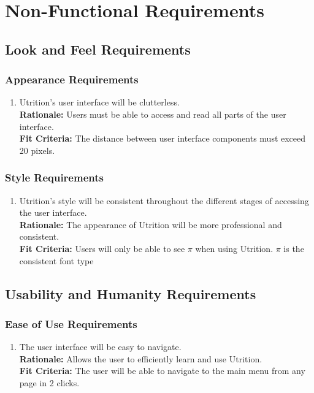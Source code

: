 \documentclass[12pt]{article}
\begin{document}
\section{Non-Functional Requirements}

\subsection{Look and Feel Requirements}

\subsubsection{Appearance Requirements}

\begin{enumerate}[{LF}1. ]
	\item Utrition’s user interface will be clutterless.\\
	\textbf{Rationale:} Users must be able to access and read all parts of the user interface. \\
	\textbf{Fit Criteria:} The distance between user interface components must exceed 20 pixels.
\end{enumerate}

\subsubsection{Style Requirements}

\begin{enumerate}[{LF}2. ]
	\item Utrition’s style will be consistent throughout the different stages of accessing the user interface.\\
	\textbf{Rationale:} The appearance of Utrition will be more professional and consistent. \\
	\textbf{Fit Criteria:} Users will only be able to see $\pi$ when using Utrition. $\pi$ is the consistent font type
\end{enumerate}

\subsection{Usability and Humanity Requirements}

\subsubsection{Ease of Use Requirements}

\begin{enumerate}[{UH}1. ]
	\item The user interface will be easy to navigate. \\
	\textbf{Rationale:} Allows the user to efficiently learn and use Utrition.\\
	\textbf{Fit Criteria:} The user will be able to navigate to the main menu from any page in 2 clicks.
\end{enumerate}
\end{document}

